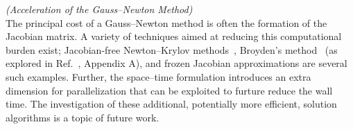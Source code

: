 \begin{remark}\label{remark:gaussnewton}\textit{(Acceleration of the
	Gauss--Newton Method)}\\
	The principal cost of a Gauss--Newton method is often the formation of the Jacobian matrix. A variety of techniques aimed at 
reducing this computational burden exist; Jacobian-free Newton--Krylov
	methods~\cite{jfnk}, Broyden's method~\cite{broyden} (as explored in
	Ref.~\cite{carlberg_thesis}, Appendix A), and frozen Jacobian approximations
	are several such examples. Further, the space--time formulation introduces
	an extra dimension for parallelization that can be exploited to furture
	reduce the wall time. The investigation of these additional, potentially
	more efficient, solution algorithms is a topic of future work. 
\end{remark}
